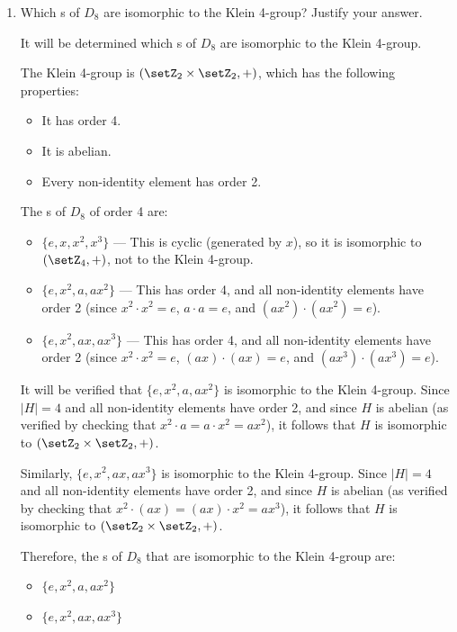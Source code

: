 \begin{enumerate}
\begin{enumerate}
\begin{subprove}
      These are all the s of \(D_{8}\).
    \end{subprove}
    \item Which s of \(D_{8}\) are isomorphic to the Klein 4-group? Justify your answer.
    \begin{subprove}
      It will be determined which s of \(D_{8}\) are isomorphic to the Klein 4-group.
      
      The Klein 4-group is \((\setZ_{2} \times \setZ_{2}, +)\), which has the following properties:
      \begin{itemize}
        \item It has order 4.
        \item It is abelian.
        \item Every non-identity element has order 2.
      \end{itemize}
      
      The s of \(D_{8}\) of order 4 are:
      \begin{itemize}
        \item \(\{e, x, x^{2}, x^{3}\}\) — This is cyclic (generated by \(x\)), so it is isomorphic to \((\setZ_{4}, +)\), not to the Klein 4-group.
        \item \(\{e, x^{2}, a, a x^{2}\}\) — This has order 4, and all non-identity elements have order 2 (since \(x^{2} \cdot x^{2} = e\), \(a \cdot a = e\), and \((a x^{2}) \cdot (a x^{2}) = e\)).
        \item \(\{e, x^{2}, a x, a x^{3}\}\) — This has order 4, and all non-identity elements have order 2 (since \(x^{2} \cdot x^{2} = e\), \((a x) \cdot (a x) = e\), and \((a x^{3}) \cdot (a x^{3}) = e\)).
      \end{itemize}
      
      It will be verified that \(\{e, x^{2}, a, a x^{2}\}\) is isomorphic to the Klein 4-group.
      Since \(|H| = 4\) and all non-identity elements have order 2, and since \(H\) is abelian (as verified by checking that \(x^{2} \cdot a = a \cdot x^{2} = a x^{2}\)), it follows that \(H\) is isomorphic to \((\setZ_{2} \times \setZ_{2}, +)\).
      
      Similarly, \(\{e, x^{2}, a x, a x^{3}\}\) is isomorphic to the Klein 4-group.
      Since \(|H| = 4\) and all non-identity elements have order 2, and since \(H\) is abelian (as verified by checking that \(x^{2} \cdot (a x) = (a x) \cdot x^{2} = a x^{3}\)), it follows that \(H\) is isomorphic to \((\setZ_{2} \times \setZ_{2}, +)\).
      
      Therefore, the s of \(D_{8}\) that are isomorphic to the Klein 4-group are:
      \begin{itemize}
        \item \(\{e, x^{2}, a, a x^{2}\}\)
        \item \(\{e, x^{2}, a x, a x^{3}\}\)
      \end{itemize}
    \end{subprove}
  \end{enumerate}
\end{enumerate}
